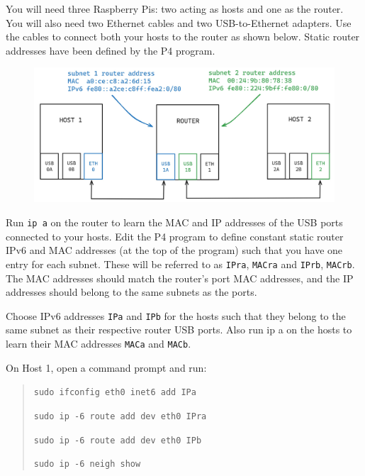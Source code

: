 



You will need three Raspberry Pis: two acting as hosts and one as the router. You will also need two Ethernet cables and two USB-to-Ethernet adapters. Use the cables to connect both your hosts to the router as shown below. Static router addresses have been defined by the P4 program.

\begin{figure}[htbp]
  \centering
    \includegraphics[width=1\textwidth]{figures/appendices/icmpv6_ndp_setup.jpg}
\end{figure}

Run \texttt{ip a} on the router to learn the MAC and IP addresses of the USB ports connected to your hosts. Edit the P4 program to define constant static router IPv6 and MAC addresses (at the top of the program) such that you have one entry for each subnet. These will be referred to as \texttt{IPra}, \texttt{MACra} and \texttt{IPrb}, \texttt{MACrb}. The MAC addresses should match the router’s port MAC addresses, and the IP addresses should belong to the same subnets as the ports. 

Choose IPv6 addresses \texttt{IPa} and \texttt{IPb} for the hosts such that they belong to the same subnet as their respective router USB ports. Also run ip a on the hosts to learn their MAC addresses \texttt{MACa} and \texttt{MACb}.

On Host 1, open a command prompt and run:
\begin{quote}
    \texttt{sudo ifconfig eth0 inet6 add IPa}
    
    \texttt{sudo ip -6 route add dev eth0 IPra}
    
    \texttt{sudo ip -6 route add dev eth0 IPb}
    
    \texttt{sudo ip -6 neigh show}
\end{quote}

